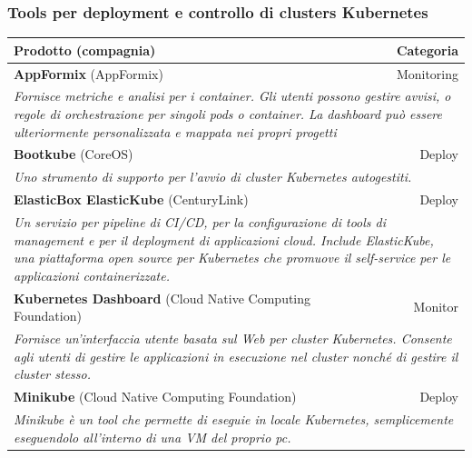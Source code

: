 \documentclass[12pt, a4paper]{report}
\begin{document}
\subsubsection{Tools per deployment e controllo di clusters Kubernetes}
\begin{table}[ht]
\small
\centering
\begin{tabularx}{\textwidth}{|lr|}
\hline
\textbf{Prodotto} (compagnia) & \textbf{Categoria}\\
\hline
\textbf{AppFormix} (AppFormix)&Monitoring\\
\multicolumn{2}{|X|}{\textit{Fornisce metriche e analisi per i container. Gli utenti possono gestire avvisi, o regole di orchestrazione per singoli pods o container. La dashboard può essere ulteriormente personalizzata e mappata nei propri progetti}}\\
\hline
\textbf{Bootkube} (CoreOS)&Deploy\\
\multicolumn{2}{|X|}{\textit{Uno strumento di supporto per l'avvio di cluster Kubernetes autogestiti.}}\\
\hline
\textbf{ElasticBox ElasticKube} (CenturyLink)&Deploy\\
\multicolumn{2}{|X|}{\textit{Un servizio per pipeline di CI/CD, per la configurazione di tools di management e per il deployment di applicazioni cloud. Include ElasticKube, una piattaforma open source per Kubernetes che promuove il self-service per le applicazioni containerizzate.}}\\
\hline
\textbf{Kubernetes Dashboard} (Cloud Native Computing Foundation)&Monitor\\
\multicolumn{2}{|X|}{\textit{Fornisce un'interfaccia utente basata sul Web per cluster Kubernetes. Consente agli utenti di gestire le applicazioni in esecuzione nel cluster nonché di gestire il cluster stesso.}}\\
\hline
\textbf{Minikube} (Cloud Native Computing Foundation)&Deploy\\
\multicolumn{2}{|X|}{\textit{Minikube è un tool che permette di eseguie in locale Kubernetes, semplicemente eseguendolo all'interno di una VM del proprio pc. }}\\
\hline
\end{tabularx}
\end{table}
\newpage
\end{document}

